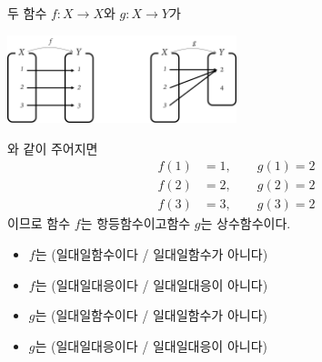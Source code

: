 \documentclass{oblivoir}
\begin{document}
%
\label{various8}
두 함수 \(f:X\to X\)와 \(g:X\to Y\)가
\begin{center}
\includegraphics[width=0.5\textwidth]{various_8}
\end{center}
와 같이 주어지면
\begin{align*}
f(1)&=1,\qquad g(1)=2\\
f(2)&=2,\qquad g(2)=2\\
f(3)&=3,\qquad g(3)=2
\end{align*}
이므로 함수 \(f\)는 항등함수이고\footnotemark\:\:함수 \(g\)는 상수함수이다.

%
\begin{itemize}\label{various9}
\item
\(f\)는 (일대일함수이다 / 일대일함수가 아니다)
\item
\(f\)는 (일대일대응이다 / 일대일대응이 아니다)
\item
\(g\)는 (일대일함수이다 / 일대일함수가 아니다)
\item
\(g\)는 (일대일대응이다 / 일대일대응이 아니다)
\end{itemize}
\end{document}
